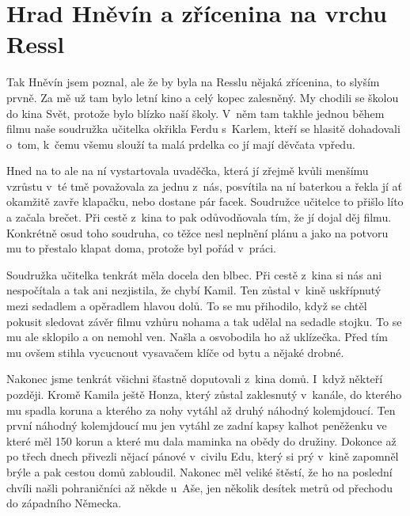 
\chapter{Hrad Hněvín a zřícenina na vrchu Ressl}

Tak Hněvín jsem poznal, ale že by byla na Resslu nějaká zřícenina, to slyším
prvně. Za mě už tam bylo letní kino a celý kopec zalesněný. My chodili se
školou do kina Svět, protože bylo blízko naší školy. V~něm tam takhle jednou
během filmu naše soudružka učitelka okřikla Ferdu s~Karlem, kteří se hlasitě
dohadovali o~tom, k~čemu všemu slouží ta malá prdelka co jí mají děvčata
vpředu.

Hned na to ale na ní vystartovala uvaděčka, která jí zřejmě kvůli menšímu
vzrůstu v~té tmě považovala za jednu z~nás, posvítila na ní baterkou a řekla jí
ať okamžitě zavře klapačku, nebo dostane pár facek. Soudružce učitelce to
přišlo líto a začala brečet. Při cestě z~kina to pak odůvodňovala tím, že jí
dojal děj filmu. Konkrétně osud toho soudruha, co těžce nesl neplnění plánu a
jako na potvoru mu to přestalo klapat doma, protože byl pořád v~práci.

Soudružka učitelka tenkrát měla docela den blbec. Při cestě z~kina si nás ani
nespočítala a tak ani nezjistila, že chybí Kamil. Ten zůstal v~kině uskřípnutý
mezi sedadlem a opěradlem hlavou dolů. To se mu přihodilo, když se chtěl
pokusit sledovat závěr filmu vzhůru nohama a tak udělal na sedadle stojku. To
se mu ale sklopilo a on nemohl ven. Našla a osvobodila ho až uklízečka. Před
tím mu ovšem stihla vycucnout vysavačem klíče od bytu a nějaké drobné.

Nakonec jsme tenkrát všichni šťastně doputovali z~kina domů. I~když někteří
později. Kromě Kamila ještě Honza, který zůstal zaklesnutý v~kanále, do kterého
mu spadla koruna a kterého za nohy vytáhl až druhý náhodný kolemjdoucí. Ten
první náhodný kolemjdoucí mu jen vytáhl ze zadní kapsy kalhot peněženku ve
které měl 150 korun a které mu dala maminka na obědy do družiny. Dokonce až po
třech dnech přivezli nějací pánové v~civilu Edu, který si prý v~kině zapomněl
brýle a pak cestou domů zabloudil. Nakonec měl veliké štěstí, že ho na poslední
chvíli našli pohraničníci až někde u~Aše, jen několik desítek metrů od přechodu
do západního Německa.

